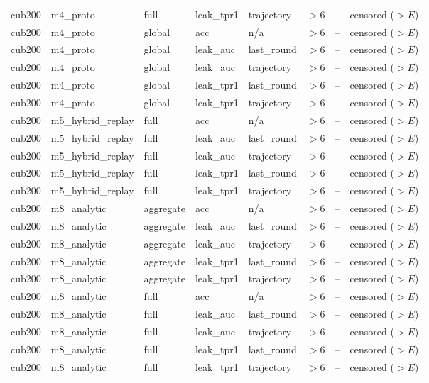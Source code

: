 \begin{tabular}{lllllrrl}
cub200 & m4\_proto & full & leak\_tpr1 & trajectory & $>$6 & -- & censored ($>E$) \\
cub200 & m4\_proto & global & acc & n/a & $>$6 & -- & censored ($>E$) \\
cub200 & m4\_proto & global & leak\_auc & last\_round & $>$6 & -- & censored ($>E$) \\
cub200 & m4\_proto & global & leak\_auc & trajectory & $>$6 & -- & censored ($>E$) \\
cub200 & m4\_proto & global & leak\_tpr1 & last\_round & $>$6 & -- & censored ($>E$) \\
cub200 & m4\_proto & global & leak\_tpr1 & trajectory & $>$6 & -- & censored ($>E$) \\
cub200 & m5\_hybrid\_replay & full & acc & n/a & $>$6 & -- & censored ($>E$) \\
cub200 & m5\_hybrid\_replay & full & leak\_auc & last\_round & $>$6 & -- & censored ($>E$) \\
cub200 & m5\_hybrid\_replay & full & leak\_auc & trajectory & $>$6 & -- & censored ($>E$) \\
cub200 & m5\_hybrid\_replay & full & leak\_tpr1 & last\_round & $>$6 & -- & censored ($>E$) \\
cub200 & m5\_hybrid\_replay & full & leak\_tpr1 & trajectory & $>$6 & -- & censored ($>E$) \\
cub200 & m8\_analytic & aggregate & acc & n/a & $>$6 & -- & censored ($>E$) \\
cub200 & m8\_analytic & aggregate & leak\_auc & last\_round & $>$6 & -- & censored ($>E$) \\
cub200 & m8\_analytic & aggregate & leak\_auc & trajectory & $>$6 & -- & censored ($>E$) \\
cub200 & m8\_analytic & aggregate & leak\_tpr1 & last\_round & $>$6 & -- & censored ($>E$) \\
cub200 & m8\_analytic & aggregate & leak\_tpr1 & trajectory & $>$6 & -- & censored ($>E$) \\
cub200 & m8\_analytic & full & acc & n/a & $>$6 & -- & censored ($>E$) \\
cub200 & m8\_analytic & full & leak\_auc & last\_round & $>$6 & -- & censored ($>E$) \\
cub200 & m8\_analytic & full & leak\_auc & trajectory & $>$6 & -- & censored ($>E$) \\
cub200 & m8\_analytic & full & leak\_tpr1 & last\_round & $>$6 & -- & censored ($>E$) \\
cub200 & m8\_analytic & full & leak\_tpr1 & trajectory & $>$6 & -- & censored ($>E$) \\

\end{tabular}
